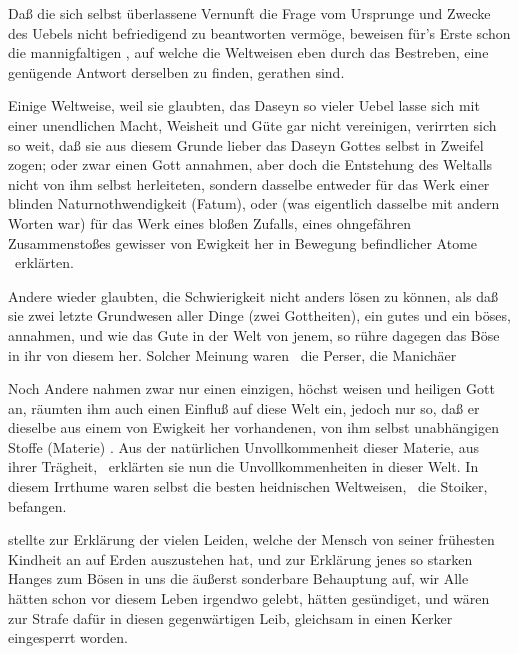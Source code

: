 Daß die sich selbst überlassene Vernunft die Frage vom Ursprunge und Zwecke des Uebels nicht befriedigend zu beantworten vermöge, beweisen für's Erste schon die mannigfaltigen , auf welche die Weltweisen eben durch das Bestreben, eine genügende Antwort derselben zu finden, gerathen sind.
\begin{aufza}
\item Einige Weltweise, weil sie glaubten, das Daseyn so vieler Uebel lasse sich mit einer unendlichen Macht, Weisheit und Güte gar nicht vereinigen, verirrten sich so weit, daß sie aus diesem Grunde lieber das Daseyn Gottes selbst in Zweifel zogen; oder zwar einen Gott annahmen, aber doch die Entstehung des Weltalls nicht von ihm selbst herleiteten, sondern dasselbe entweder für das Werk einer blinden Naturnothwendigkeit (Fatum), oder (was eigentlich dasselbe mit andern Worten war) für das Werk eines bloßen Zufalls, eines ohngefähren Zusammenstoßes gewisser von Ewigkeit her in Bewegung befindlicher Atome \udgl\  erklärten.
\item Andere wieder glaubten, die Schwierigkeit nicht anders lösen zu können, als daß sie zwei letzte Grundwesen aller Dinge (zwei Gottheiten), ein gutes und ein böses, annahmen, und wie das Gute in der Welt von jenem, so rühre dagegen das Böse in ihr von diesem her. Solcher Meinung waren \zB\ die Perser, die Manichäer \uA ~
\item Noch Andere nahmen zwar nur einen einzigen, höchst weisen und heiligen Gott an, räumten ihm auch einen Einfluß auf diese Welt ein, jedoch nur so, daß er dieselbe aus einem von Ewigkeit her vorhandenen, von ihm selbst unabhängigen Stoffe (Materie) . Aus der natürlichen Unvollkommenheit dieser Materie, aus ihrer Trägheit, \udgl\  erklärten sie nun die Unvollkommenheiten in dieser Welt. In diesem Irrthume waren selbst die besten heidnischen Weltweisen, \zB\ die Stoiker, befangen.
\item {} stellte zur Erklärung der vielen Leiden, welche der Mensch von seiner frühesten Kindheit an auf Erden auszustehen hat, und zur Erklärung jenes so starken Hanges zum Bösen in uns die äußerst sonderbare Behauptung auf, wir Alle hätten schon vor diesem Leben irgendwo gelebt, hätten gesündiget, und wären zur Strafe dafür in diesen gegenwärtigen Leib, gleichsam in einen Kerker eingesperrt worden.

\end{aufza}
